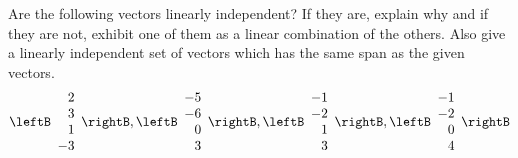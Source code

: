 \begin{enumialphparenastyle}
\begin{ex} Are the following vectors linearly independent? If they are, explain
why and if they are not, exhibit one of them as a linear combination of the
others. Also give a linearly independent set of vectors which has the same
span as the given vectors. 
\begin{equation*}
\leftB 
\begin{array}{r}
2 \\ 
3 \\ 
1 \\ 
-3
\end{array}
\rightB ,\leftB 
\begin{array}{r}
-5 \\ 
-6 \\ 
0 \\ 
3
\end{array}
\rightB ,\leftB 
\begin{array}{r}
-1 \\ 
-2 \\ 
1 \\ 
3
\end{array}
\rightB ,\leftB 
\begin{array}{r}
-1 \\ 
-2 \\ 
0 \\ 
4
\end{array}
\rightB
\end{equation*}
\end{ex}


\end{enumialphparenastyle}
